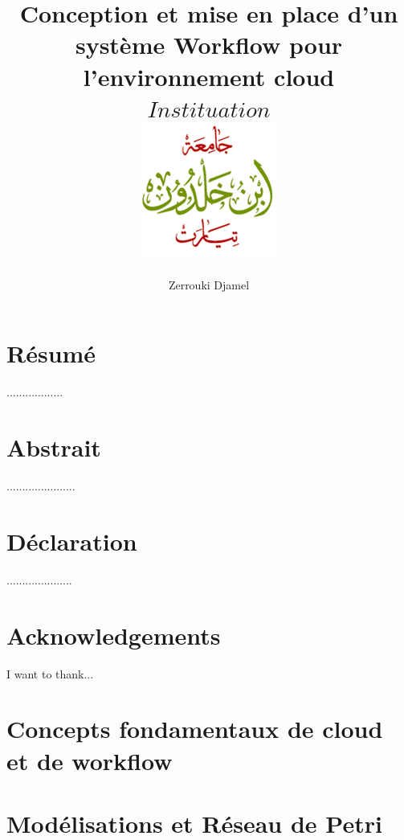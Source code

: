 \documentclass[12pt,twoside]{report}
\title{
	{\textbf{Conception et mise en place d’un système Workflow  pour l'environnement cloud}} \\   
	{$ Instituation $}\\
	{\includegraphics{univtiaret.png}}
}
\author{Zerrouki Djamel}
\begin{document}
 
\chapter*{Résumé}
..................

\chapter*{Abstrait}
......................

\chapter*{Déclaration}
.....................

\chapter*{Acknowledgements}
I want to thank...
\listoffigures

\listoftables

\tableofcontents


\chapter{Concepts fondamentaux de cloud et de workflow }



\chapter{Modélisations et Réseau de Petri}


%
 
 
 

 \printbibliography
\end{document}
